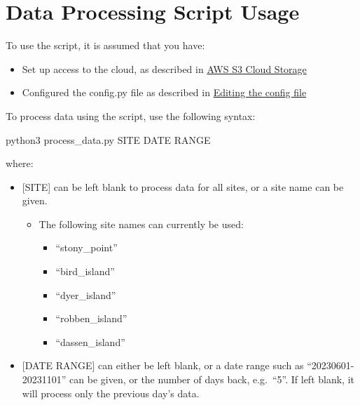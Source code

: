 \documentclass[
  letterpaper,
]{scrbook}
\newenvironment{Shaded}{\begin{snugshade}}{\end{snugshade}}
\newcommand{\ExtensionTok}[1]{\textcolor[rgb]{0.00,0.23,0.31}{#1}}
\newcommand{\NormalTok}[1]{\textcolor[rgb]{0.00,0.23,0.31}{#1}}
\begin{document}
\section{Data Processing Script
Usage}\label{data-processing-script-usage}

To use the script, it is assumed that you have:

\begin{itemize}
\item
  Set up access to the cloud, as described in
  \hyperref[AWSux5cux2520S3ux5cux2520Cloudux5cux2520Storage]{AWS S3
  Cloud Storage}
\item
  Configured the config.py file as described in
  \hyperref[Editingux5cux2520theux5cux2520configux5cux2520file]{Editing
  the config file}
\end{itemize}

To process data using the script, use the following syntax:

\begin{Shaded}
\begin{Highlighting}[]
\ExtensionTok{python3}\NormalTok{ process\_data.py SITE DATE RANGE}
\end{Highlighting}
\end{Shaded}

where:

\begin{itemize}
\item
  {[}SITE{]} can be left blank to process data for all sites, or a site
  name can be given.

  \begin{itemize}
  \item
    The following site names can currently be used:

    \begin{itemize}
    \item
      ``stony\_point''
    \item
      ``bird\_island''
    \item
      ``dyer\_island''
    \item
      ``robben\_island''
    \item
      ``dassen\_island''
    \end{itemize}
  \end{itemize}
\item
  {[}DATE RANGE{]} can either be left blank, or a date range such as
  ``20230601-20231101'' can be given, or the number of days back,
  e.g.~``5''. If left blank, it will process only the previous day's
  data.
\end{itemize}
\end{document}
